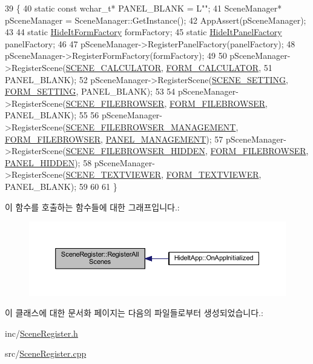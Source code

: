 \begin{DoxyCode}
39                                           \{
40     \textcolor{keyword}{static} \textcolor{keyword}{const} \textcolor{keywordtype}{wchar\_t}* PANEL\_BLANK = L\textcolor{stringliteral}{""};
41     SceneManager* pSceneManager = SceneManager::GetInstance();
42     AppAssert(pSceneManager);
43 
44     \textcolor{keyword}{static} \hyperlink{class_hide_it_form_factory}{HideItFormFactory} formFactory;
45     \textcolor{keyword}{static} \hyperlink{class_hide_it_panel_factory}{HideItPanelFactory} panelFactory;
46 
47     pSceneManager->RegisterPanelFactory(panelFactory);
48     pSceneManager->RegisterFormFactory(formFactory);
49 
50     pSceneManager->RegisterScene(\hyperlink{_scene_register_8cpp_adf053a3b853b3a51918814ed331436cc}{SCENE\_CALCULATOR}, 
      \hyperlink{_hide_it_form_factory_8h_a425a611240e669d4b6bccb6c70fd1e1b}{FORM\_CALCULATOR},
51             PANEL\_BLANK);
52     pSceneManager->RegisterScene(\hyperlink{_scene_register_8cpp_ae2da98cb726565d357021f7d4e0b914e}{SCENE\_SETTING}, \hyperlink{_hide_it_form_factory_8h_a52c03680a60f4c67df2e836a73c1dfa7}{FORM\_SETTING}, PANEL\_BLANK);
53 
54     pSceneManager->RegisterScene(\hyperlink{_scene_register_8cpp_a942f4fffc3524e46745d54b92ca57b87}{SCENE\_FILEBROWSER}, 
      \hyperlink{_hide_it_form_factory_8h_a6c375be4c97a7149bf3d7ad641ff0022}{FORM\_FILEBROWSER}, PANEL\_BLANK);
55 
56     pSceneManager->RegisterScene(\hyperlink{_scene_register_8cpp_ad2cc89ed96c8bd4c94f954f01ef0f56e}{SCENE\_FILEBROWSER\_MANAGEMENT}, 
      \hyperlink{_hide_it_form_factory_8h_a6c375be4c97a7149bf3d7ad641ff0022}{FORM\_FILEBROWSER}, \hyperlink{_hide_it_panel_factory_8h_adfa2b4ae9db98acfbf94879073f53f0d}{PANEL\_MANAGEMENT});
57     pSceneManager->RegisterScene(\hyperlink{_scene_register_8cpp_a941a02ceb430e35a99e905974dd4faf3}{SCENE\_FILEBROWSER\_HIDDEN}, 
      \hyperlink{_hide_it_form_factory_8h_a6c375be4c97a7149bf3d7ad641ff0022}{FORM\_FILEBROWSER}, \hyperlink{_hide_it_panel_factory_8h_a99fea23768afc488a86d71365b090b9e}{PANEL\_HIDDEN});
58     pSceneManager->RegisterScene(\hyperlink{_scene_register_8cpp_ae1bf17a8d34c2299913194cf4c86f04d}{SCENE\_TEXTVIEWER}, 
      \hyperlink{_hide_it_form_factory_8h_a0684aff53dd7aa5443c992372709015b}{FORM\_TEXTVIEWER}, PANEL\_BLANK);
59 
60 
61 \}
\end{DoxyCode}


이 함수를 호출하는 함수들에 대한 그래프입니다.\+:
\nopagebreak
\begin{figure}[H]
\begin{center}
\leavevmode
\includegraphics[width=350pt]{class_scene_register_aec7affc4301e23183672e6e0196bdd91_icgraph}
\end{center}
\end{figure}




이 클래스에 대한 문서화 페이지는 다음의 파일들로부터 생성되었습니다.\+:\begin{DoxyCompactItemize}
\item 
inc/\hyperlink{_scene_register_8h}{Scene\+Register.\+h}\item 
src/\hyperlink{_scene_register_8cpp}{Scene\+Register.\+cpp}\end{DoxyCompactItemize}
